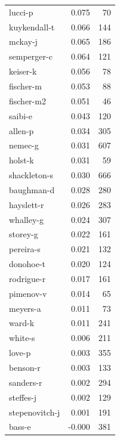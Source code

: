 \documentclass{vldb}
\begin{document}
\begin{appendix}
\begin{supertabular}{ l r r }
lucci-p        &                 0.075 &      70 \\
kuykendall-t   &                 0.066 &     144 \\
mckay-j        &                 0.065 &     186 \\
semperger-c    &                 0.064 &     121 \\
keiser-k       &                 0.056 &      78 \\
fischer-m      &                 0.053 &      88 \\
fischer-m2     &                 0.051 &      46 \\
saibi-e        &                 0.043 &     120 \\
allen-p        &                 0.034 &     305 \\
nemec-g        &                 0.031 &     607 \\
holst-k        &                 0.031 &      59 \\
shackleton-s   &                 0.030 &     666 \\
baughman-d     &                 0.028 &     280 \\
hayslett-r     &                 0.026 &     283 \\
whalley-g      &                 0.024 &     307 \\
storey-g       &                 0.022 &     161 \\
pereira-s      &                 0.021 &     132 \\
donohoe-t      &                 0.020 &     124 \\
rodrigue-r     &                 0.017 &     161 \\
pimenov-v      &                 0.014 &      65 \\
meyers-a       &                 0.011 &      73 \\
ward-k         &                 0.011 &     241 \\
white-s        &                 0.006 &     211 \\
love-p         &                 0.003 &     355 \\
benson-r       &                 0.003 &     133 \\
sanders-r      &                 0.002 &     294 \\
steffes-j      &                 0.002 &     129 \\
stepenovitch-j &                 0.001 &     191 \\
bass-e         &                -0.000 &     381 \\

\end{supertabular}
\end{appendix}
\end{document}
